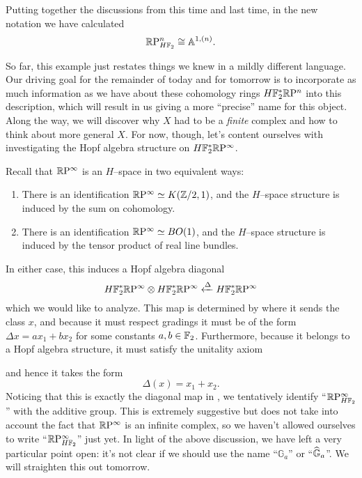 \begin{example}
Putting together the discussions from this time and last time, in the new notation we have calculated \[\mathbb R\mathrm P^n_{H\mathbb F_2} \cong \mathbb A^{1, (n)}.\]
\end{example}

So far, this example just restates things we knew in a mildly different language.  Our driving goal for the remainder of today and for tomorrow is to incorporate as much information as we have about these cohomology rings $H\mathbb F_2^* \mathbb R\mathrm P^n$ into this description, which will result in us giving a more ``precise'' name for this object.  Along the way, we will discover why $X$ had to be a \emph{finite} complex and how to think about more general $X$.  For now, though, let's content ourselves with investigating the Hopf algebra structure on $H\mathbb F_2^* \mathbb R\mathrm P^\infty$.

\begin{example}\label{RPExampleFaulty}
Recall that $\mathbb R\mathrm P^\infty$ is an $H$--space in two equivalent ways:
\begin{enumerate}
\item There is an identification $\mathbb R\mathrm P^\infty \simeq K(\mathbb Z/2, 1)$, and the $H$--space structure is induced by the sum on cohomology.
\item There is an identification $\mathbb R\mathrm P^\infty \simeq BO(1)$, and the $H$--space structure is induced by the tensor product of real line bundles.
\end{enumerate}
In either case, this induces a Hopf algebra diagonal \[H\mathbb F_2^* \mathbb R\mathrm P^\infty \otimes H\mathbb F_2^* \mathbb R\mathrm P^\infty \xleftarrow\Delta H\mathbb F_2^* \mathbb R\mathrm P^\infty\] which we would like to analyze.  This map is determined by where it sends the class $x$, and because it must respect gradings it must be of the form $\Delta x = ax_1 + bx_2$ for some constants $a, b \in \mathbb F_2$.  Furthermore, because it belongs to a Hopf algebra structure, it must satisfy the unitality axiom
\begin{center}
\end{center}
and hence it takes the form \[\Delta(x) = x_1 + x_2.\]  Noticing that this is exactly the diagonal map in , we tentatively identify ``$\mathbb R\mathrm P^\infty_{H\mathbb F_2}$'' with the additive group.  This is extremely suggestive but does not take into account the fact that $\mathbb R\mathrm P^\infty$ is an infinite complex, so we haven't allowed ourselves to write ``$\mathbb R\mathrm P^\infty_{H\mathbb F_2}$'' just yet.  In light of the above discussion, we have left a very particular point open: it's not clear if we should use the name ``$\mathbb G_a$'' or ``$\widehat{\mathbb G}_a$''.  We will straighten this out tomorrow.
\end{example}








